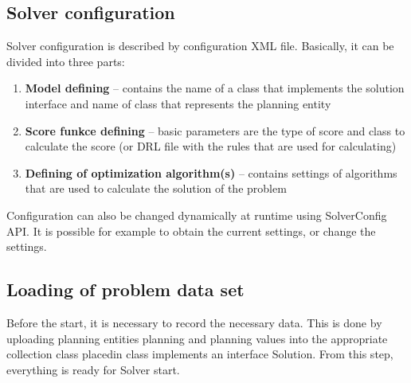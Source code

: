 \subsection{Solver configuration}
Solver configuration is described by configuration XML file. Basically, it can be divided into three parts:

\begin{enumerate}
\item \textbf{Model defining} -- contains the name of a class that implements the solution interface and name of class that represents the planning entity
\item \textbf{Score funkce defining} -- basic parameters are the type of score and class to calculate the score (or DRL file with the rules that are used for calculating)
\item \textbf{Defining of optimization algorithm(s)} -- contains settings of algorithms that are used to calculate the solution of the problem
\end{enumerate}

Configuration can also be changed dynamically at runtime using SolverConfig API. It is possible for example to obtain the current settings, or change the settings.

\subsection{Loading of problem data set}
Before the start, it is necessary to record the necessary data. This is done by uploading planning entities planning and planning values into the appropriate collection class placedin class implements an interface Solution. From this step, everything is ready for Solver start.

